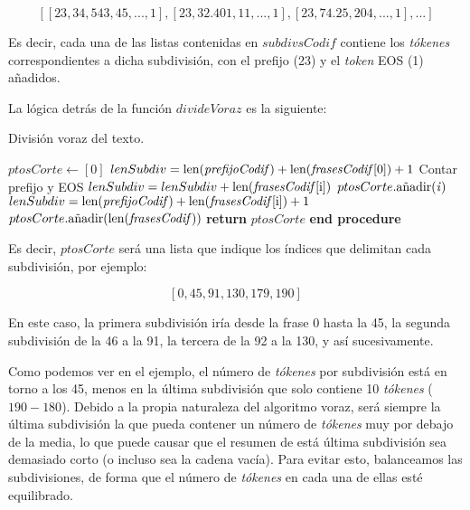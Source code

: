 \vspace{-0.5cm}

\[ [[23, 34, 543, 45, ..., 1], [23, 32. 401, 11, ..., 1], [23, 74. 25, 204, ..., 1], ...] \]

Es decir, cada una de las listas contenidas en $subdivsCodif$ contiene los \emph{tókenes} correspondientes a dicha subdivisión, con el prefijo (23) y el \emph{token} EOS (1) añadidos.
	
La lógica detrás de la función $divideVoraz$ es la siguiente:

\begin{algorithm}
	\caption{División voraz del texto.}\label{alg:divide-voraz}
	\begin{algorithmic}[1]
		\State $ptosCorte \gets [0]$
		\State $lenSubdiv = \text{len(\textit{prefijoCodif})} + \text{len(\textit{frasesCodif}[0])} + 1$ \Comment Contar prefijo y EOS
			\State $lenSubdiv = lenSubdiv + \text{len(\textit{frasesCodif}[i])}$
				\State $ptosCorte.\text{añadir(\textit{i})}$
				\State $lenSubdiv = \text{len(\textit{prefijoCodif})} + \text{len(\textit{frasesCodif}[i])} + 1$
			\EndIf
		\EndFor
		\State $ptosCorte.\text{añadir(len(\textit{frasesCodif}))}$
		\State \textbf{return} $ptosCorte$
		\State \hspace{-0.5cm}\textbf{end procedure}
		\EndProcedure
	\end{algorithmic}
\end{algorithm}

Es decir, $ptosCorte$ será una lista que indique los índices que delimitan cada subdivisión, por ejemplo:

\vspace{-0.5cm}

\[ [0, 45, 91, 130, 179, 190] \]

En este caso, la primera subdivisión iría desde la frase 0 hasta la 45, la segunda subdivisión de la 46 a la 91, la tercera de la 92 a la 130, y así sucesivamente.

Como podemos ver en el ejemplo, el número de \emph{tókenes} por subdivisión está en torno a los 45, menos en la última subdivisión que solo contiene 10 \emph{tókenes} ($190-180$). Debido a la propia naturaleza del algoritmo voraz, será siempre la última subdivisión la que pueda contener un número de \emph{tókenes} muy por debajo de la media, lo que puede causar que el resumen de está última subdivisión sea demasiado corto (o incluso sea la cadena vacía). Para evitar esto, balanceamos las subdivisiones, de forma que el número de \emph{tókenes} en cada una de ellas esté equilibrado.


